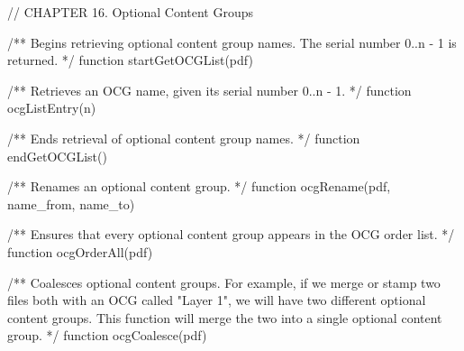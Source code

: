 // CHAPTER 16. Optional Content Groups

/** Begins retrieving optional content group names. The serial number 0..n - 1
is returned. */
function startGetOCGList(pdf)

/** Retrieves an OCG name, given its serial number 0..n - 1. */
function ocgListEntry(n)

/** Ends retrieval of optional content group names. */
function endGetOCGList()

/** Renames an optional content group. */
function ocgRename(pdf, name_from, name_to)

/** Ensures that every optional content group appears in the OCG order list. */
function ocgOrderAll(pdf)

/** Coalesces optional content groups. For example, if we merge or stamp two
files both with an OCG called "Layer 1", we will have two different optional
content groups. This function will merge the two into a single optional
content group. */
function ocgCoalesce(pdf)
